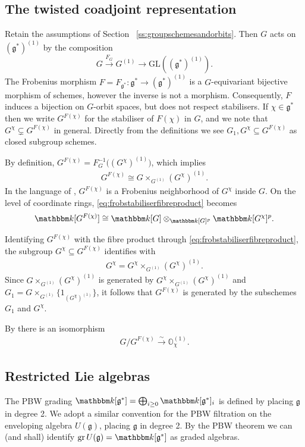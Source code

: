 \documentclass[twoside,12pt,reqno]{amsart}
\theoremstyle{remark}
\numberwithin{equation}{section}
\def\isoto{\overset{\sim}{\longrightarrow}}
\def\k{{\mathbbm k}}
\def\gr{\operatorname{gr}}
\def\O{{\mathbb O}}
\def\GL{\mathrm{GL}}
\def\g{{\mathfrak g}}
\begin{document}
\subsection{The twisted coadjoint representation}
\label{ss:twistedcoadjoint}

Retain the assumptions of Section ~\ref{ss:groupschemesandorbits}. Then $G$ acts on $(\g^*)^{(1)}$ by the composition
$$G \overset{F_G}{\longrightarrow} G^{(1)} \longrightarrow \GL((\g^*)^{(1)}).$$ The Frobenius morphism $F = F_{\g^*} : \g^* \to (\g^*)^{(1)}$ is a $G$-equivariant bijective morphism of schemes, however the inverse is not a morphism. Consequently, $F$ induces a bijection on $G$-orbit spaces, but does not respect stabilisers. If $\chi \in \g^*$ then we write $G^{F(\chi)}$ for the stabiliser of $F(\chi)$ in $G$, and we note that $G^\chi \subsetneq G^{F(\chi)}$ in general. Directly from the definitions we see $G_1, G^\chi \subseteq G^{F(\chi)}$ as closed subgroup schemes.

By definition, $G^{F(\chi)} = F_G^{-1}\big((G^\chi)^{(1)}\big)$, which implies
\begin{eqnarray}
\label{eq:frobstabiliserfibreproduct}
    G^{F(\chi)} \cong G \times_{G^{(1)}} (G^\chi)^{(1)}. 
\end{eqnarray}
In the language of \cite{BMR}, $G^{F(\chi)}$ is a Frobenius neighborhood of $G^\chi$ inside $G$. On the level of coordinate rings, \eqref{eq:frobstabiliserfibreproduct} becomes 
\begin{eqnarray}
\label{eq:coordfrobstabiliserfibreproduct}
    \k[G^{F(\chi)}] \cong \k[G] \otimes_{\k[G]^p} \k[G^\chi]^p. 
\end{eqnarray}

Identifying $G^{F(\chi)}$ with the fibre product through \eqref{eq:frobstabiliserfibreproduct}, the subgroup $G^\chi\subseteq G^{F(\chi)}$ identifies with
\begin{eqnarray}
    G^\chi = G^\chi \times_{G^{(1)}} (G^\chi)^{(1)}.
\end{eqnarray}
Since $G \times_{G^{(1)}} (G^\chi)^{(1)}$ is generated by $G^\chi \times_{G^{(1)}} (G^\chi)^{(1)}$ and $G_1 = G \times_{G^{(1)}} \{1_{(G^\chi)^{(1)}}\}$, it follows that $G^{F(\chi)}$ is generated by the subschemes $G_1$ and $G^\chi$.

By \cite[I.5.6(2)]{JanRAGS} there is an isomorphism 
\begin{eqnarray}
    G / G^{F(\chi)} \isoto \O_{\chi}^{(1)}.
\end{eqnarray}
	
\subsection{Restricted Lie algebras} \label{ss:restrictedLiealgebras}
The PBW grading $\k[\g^*] = \bigoplus_{i \ge 0} \k[\g^*]_i$ is defined by placing $\g$ in degree 2. We adopt a similar convention for the PBW filtration on the enveloping algebra $U(\g)$, placing $\g$ in degree 2. By the PBW theorem we can (and shall) identify $\gr U(\g) = \k[\g^*]$ as graded algebras.
\end{document}

